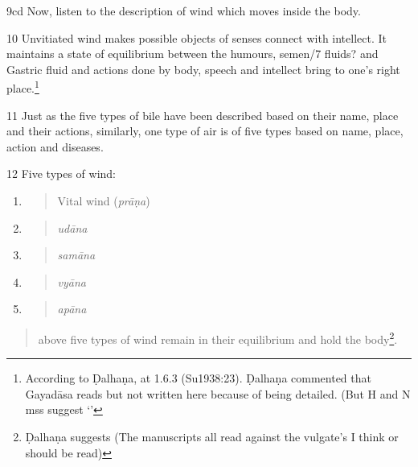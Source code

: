 \begin{translation}
\item[9cd] Now, listen to the description of wind which moves inside the
body.
                    
\item[10] Unvitiated wind makes possible objects of senses connect with
intellect. It maintains a state of equilibrium between the humours,
semen/7 fluids? and Gastric fluid and actions done by body, speech and
intellect bring to one's right place.\footnote{ According to Ḍalhaṇa,
    at 1.6.3 (Su1938:23). Ḍalhaṇa commented that
    Gayadāsa reads but not written here
    because of being detailed. (But H and N mss suggest `'}

\item[11] Just as the five types of bile have been described based 
on their
name, place and their actions, similarly, one type of air is of five
types based on name, place, action and diseases.

\item[12] Five types of wind:

\begin{enumerate}
    \def\labelenumi{\arabic{enumi}.}
    \item
    \begin{quote}
        Vital wind (\emph{prāṇa})
    \end{quote}
    \item
    \begin{quote}
        \emph{udāna }
    \end{quote}
    \item
    \begin{quote}
        \emph{samāna}
    \end{quote}
    \item
    \begin{quote}
        \emph{vyāna}
    \end{quote}
    \item
    \begin{quote}
        \emph{apāna}
    \end{quote}
\end{enumerate}

\begin{quote}
    above five types of wind remain in their equilibrium and hold the
body\footnote{ Ḍalhaṇa suggests 
    (The manuscripts all read        against the vulgate's  I think  or  should be read)}.
    \end{quote}
    

\end{translation}
